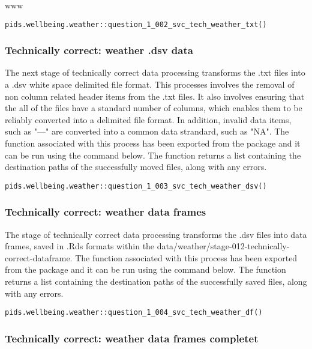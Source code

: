 www\documentclass[12pt, oneside, openany]{book}
\begin{document}
\begin{verbatim}
pids.wellbeing.weather::question_1_002_svc_tech_weather_txt()
\end{verbatim}

\subsubsection*{Technically correct: weather .dsv data}

The next stage of technically correct data processing transforms the .txt files into a .dsv white space delimited file format. This processes involves the removal of non column related header items from the .txt files. It also involves ensuring that the all of the files have a standard number of columns, which enables them to be reliably converted into a delimited file format. In addition, invalid data items, such as "---" are converted into a common data strandard, such as "NA". The function associated with this process has been exported from the package and it can be run using the command below. The function returns a list containing the destination paths of the successfully moved files, along with any errors.

\begin{verbatim}
pids.wellbeing.weather::question_1_003_svc_tech_weather_dsv()
\end{verbatim}

\subsubsection*{Technically correct: weather data frames}

The stage of technically correct data processing transforms the .dsv files into data frames, saved in .Rds formats within the data/weather/stage-012-technically-correct-dataframe. The function associated with this process has been exported from the package and it can be run using the command below. The function returns a list containing the destination paths of the successfully saved files, along with any errors.

\begin{verbatim}
pids.wellbeing.weather::question_1_004_svc_tech_weather_df()
\end{verbatim}

\subsubsection*{Technically correct: weather data frames completet}
\end{document}
